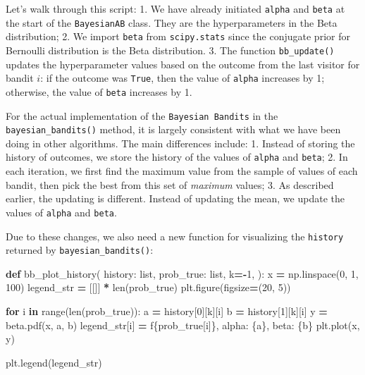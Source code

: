 \documentclass[
]{book}
\newenvironment{Shaded}{\begin{snugshade}}{\end{snugshade}}
\newcommand{\BuiltInTok}[1]{#1}
\newcommand{\ControlFlowTok}[1]{\textcolor[rgb]{0.13,0.29,0.53}{\textbf{#1}}}
\newcommand{\DecValTok}[1]{\textcolor[rgb]{0.00,0.00,0.81}{#1}}
\newcommand{\KeywordTok}[1]{\textcolor[rgb]{0.13,0.29,0.53}{\textbf{#1}}}
\newcommand{\NormalTok}[1]{#1}
\newcommand{\OperatorTok}[1]{\textcolor[rgb]{0.81,0.36,0.00}{\textbf{#1}}}
\newcommand{\SpecialCharTok}[1]{\textcolor[rgb]{0.00,0.00,0.00}{#1}}
\newcommand{\SpecialStringTok}[1]{\textcolor[rgb]{0.31,0.60,0.02}{#1}}
\theoremstyle{definition}
\theoremstyle{definition}
\theoremstyle{definition}
\theoremstyle{definition}
\theoremstyle{remark}
\begin{document}
Let's walk through this script:
1. We have already initiated \texttt{alpha} and \texttt{beta} at the start of the \texttt{BayesianAB} class. They are the hyperparameters in the Beta distribution;
2. We import \texttt{beta} from \texttt{scipy.stats} since the conjugate prior for Bernoulli distribution is the Beta distribution.
3. The function \texttt{bb\_update()} updates the hyperparameter values based on the outcome from the last visitor for bandit \(i\): if the outcome was \texttt{True}, then the value of \texttt{alpha} increases by 1; otherwise, the value of \texttt{beta} increases by 1.

For the actual implementation of the \texttt{Bayesian\ Bandits} in the \texttt{bayesian\_bandits()} method, it is largely consistent with what we have been doing in other algorithms. The main differences include:
1. Instead of storing the history of outcomes, we store the history of the values of \texttt{alpha} and \texttt{beta};
2. In each iteration, we first find the maximum value from the sample of values of each bandit, then pick the best from this set of \emph{maximum} values;
3. As described earlier, the updating is different. Instead of updating the mean, we update the values of \texttt{alpha} and \texttt{beta}.

Due to these changes, we also need a new function for visualizing the \texttt{history} returned by \texttt{bayesian\_bandits()}:

\begin{Shaded}
\begin{Highlighting}[]
\KeywordTok{def}\NormalTok{ bb\_plot\_history(}
\NormalTok{        history: }\BuiltInTok{list}\NormalTok{,}
\NormalTok{        prob\_true: }\BuiltInTok{list}\NormalTok{,}
\NormalTok{        k}\OperatorTok{={-}}\DecValTok{1}\NormalTok{,}
\NormalTok{):}
\NormalTok{    x }\OperatorTok{=}\NormalTok{ np.linspace(}\DecValTok{0}\NormalTok{, }\DecValTok{1}\NormalTok{, }\DecValTok{100}\NormalTok{)}
\NormalTok{    legend\_str }\OperatorTok{=}\NormalTok{ [[]] }\OperatorTok{*} \BuiltInTok{len}\NormalTok{(prob\_true)}
\NormalTok{    plt.figure(figsize}\OperatorTok{=}\NormalTok{(}\DecValTok{20}\NormalTok{, }\DecValTok{5}\NormalTok{))}

    \ControlFlowTok{for}\NormalTok{ i }\KeywordTok{in} \BuiltInTok{range}\NormalTok{(}\BuiltInTok{len}\NormalTok{(prob\_true)):}
\NormalTok{        a }\OperatorTok{=}\NormalTok{ history[}\DecValTok{0}\NormalTok{][k][i]}
\NormalTok{        b }\OperatorTok{=}\NormalTok{ history[}\DecValTok{1}\NormalTok{][k][i]}
\NormalTok{        y }\OperatorTok{=}\NormalTok{ beta.pdf(x, a, b)}
\NormalTok{        legend\_str[i] }\OperatorTok{=} \SpecialStringTok{f\textquotesingle{}}\SpecialCharTok{\{}\NormalTok{prob\_true[i]}\SpecialCharTok{\}}\SpecialStringTok{, alpha: }\SpecialCharTok{\{}\NormalTok{a}\SpecialCharTok{\}}\SpecialStringTok{, beta: }\SpecialCharTok{\{}\NormalTok{b}\SpecialCharTok{\}}\SpecialStringTok{\textquotesingle{}}
\NormalTok{        plt.plot(x, y)}

\NormalTok{    plt.legend(legend\_str)}
\end{Highlighting}
\end{Shaded}
\end{document}
